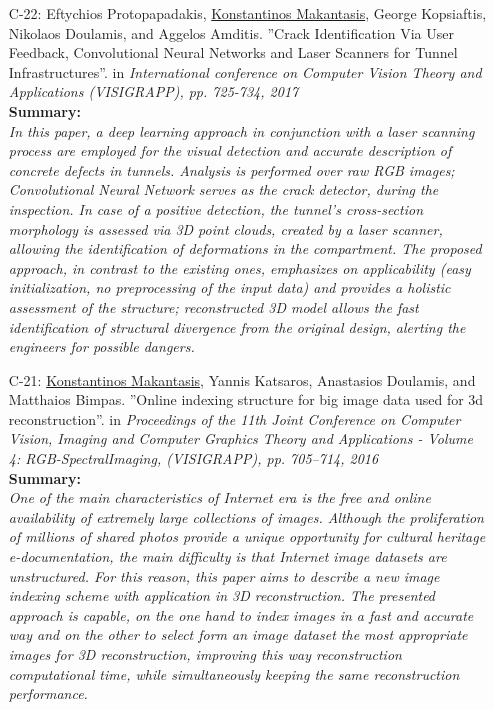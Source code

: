 \documentclass[a4paper,10pt]{article}
\begin{document}
\begin{itemize}
	\item [C-22:]Eftychios Protopapadakis, \underline{Konstantinos Makantasis}, George Kopsiaftis, Nikolaos Doulamis, and Aggelos Amditis. ''Crack Identification Via User Feedback, Convolutional Neural Networks and Laser Scanners for Tunnel Infrastructures''. in \textit{International conference on Computer Vision Theory and Applications (VISIGRAPP), pp. 725-734, 2017}\\
	\textbf{Summary:}\\
	\textit{In this paper, a deep learning approach in conjunction with a laser scanning process are employed for the visual detection and accurate description of concrete defects in tunnels. Analysis is performed over raw RGB images; Convolutional Neural Network serves as the crack detector, during the inspection. In case of a positive detection, the tunnel’s cross-section morphology is assessed via 3D point clouds, created by a laser scanner, allowing the identification of deformations in the compartment. The proposed approach, in contrast to the existing ones, emphasizes on applicability (easy initialization, no preprocessing of the input data) and provides a holistic assessment of the structure; reconstructed 3D model allows the fast identification of structural divergence from the original design, alerting the engineers for possible dangers.}
	
	\item [C-21:]\underline{Konstantinos Makantasis}, Yannis Katsaros, Anastasios Doulamis, and Matthaios Bimpas. ''Online indexing structure for big image data used for 3d reconstruction''. in \textit{Proceedings of the 11th Joint Conference on Computer Vision, Imaging and Computer Graphics Theory and Applications - Volume 4: RGB-SpectralImaging, (VISIGRAPP), pp. 705–714, 2016}\\
	\textbf{Summary:}\\
	\textit{One of the main characteristics of Internet era is the free and online availability of extremely large collections of images. Although the proliferation of millions of shared photos provide a unique opportunity for cultural heritage e-documentation, the main difficulty is that Internet image datasets are unstructured. For this reason, this paper aims to describe a new image indexing scheme with application in 3D reconstruction. The presented approach is capable, on the one hand to index images in a fast and accurate way and on the other to select form an image dataset the most appropriate images for 3D reconstruction, improving this way reconstruction computational time, while simultaneously keeping the same reconstruction performance.}
	

\end{itemize}
\end{document}
